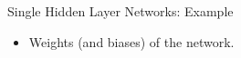 \begin{frame} {Single Hidden Layer Networks: Example}
  \begin{itemize}
    \item Weights (and biases) of the network.
  \begin{figure}
    \centering

\end{figure}
\end{itemize}
\end{frame}
